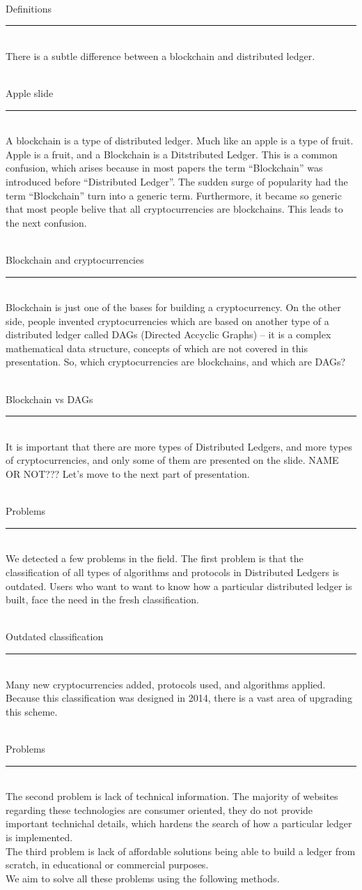 \documentclass[12pt]{article}
\renewcommand{\line}[1]{\noindent\\{#1}\vspace{-0.42cm}\\\rule{\textwidth}{1pt}\\}
\begin{document}
\line{Definitions}
There is a subtle difference between a blockchain and distributed ledger.

\line{Apple slide}
A blockchain is a type of distributed ledger. Much like an apple is a type of
fruit. Apple is a fruit, and a Blockchain is a Ditstributed Ledger. This is a
common confusion, which arises because in most papers the term ``Blockchain''
was introduced before ``Distributed Ledger''. The sudden surge of popularity
had the term ``Blockchain'' turn into a generic term. Furthermore, it became so
generic that most people belive that all cryptocurrencies are blockchains. This
leads to the next confusion.

\line{Blockchain and cryptocurrencies}
Blockchain is just one of the bases for building a cryptocurrency. On the other
side, people invented cryptocurrencies which are based on another type of a
distributed ledger called DAGs (Directed Accyclic Graphs) -- it is a complex
mathematical data structure, concepts of which are not covered in this
presentation. So, which cryptocurrencies are blockchains, and which are DAGs?

\line{Blockchain vs DAGs}
It is important that there are more types of Distributed Ledgers, and more
types of cryptocurrencies, and only some of them are presented on the slide.
NAME OR NOT??? Let's move to the next part of presentation.

\line{Problems}
We detected a few problems in the field. The first problem is that the
classification of all types of algorithms and protocols in Distributed Ledgers
is outdated. Users who want to want to know how a particular distributed ledger
is built, face the need in the fresh classification.

\line{Outdated classification}
Many new cryptocurrencies added, protocols used, and algorithms applied.
Because this classification was designed in 2014, there is a vast area of
upgrading this scheme.

\line{Problems}
The second problem is lack of technical information. The majority of websites
regarding these technologies are consumer oriented, they do not provide
important technichal details, which hardens the search of how a particular
ledger is implemented.\\
The third problem is lack of affordable solutions being able to build a ledger
from scratch, in educational or commercial purposes.\\
We aim to solve all these problems using the following methods.
\end{document}
